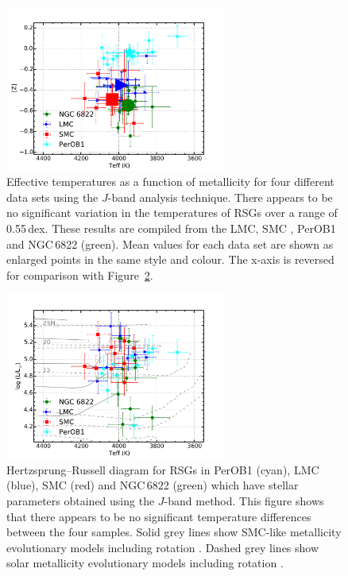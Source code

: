 \begin{figure}
 \centering
\includegraphics[width=0.65\textwidth]{ngc6822/N6822_TeffvsZ-thesis}
\caption[Effective temperature as a function of metallicity from four different environments]{
Effective temperatures as a function of metallicity for four different data sets using the $J$-band analysis technique.
There appears to be no significant variation in the temperatures of RSGs over a range of 0.55\,dex.
These results are compiled from the LMC, SMC
\protect\citep[blue and red points respectively;][]{2015ApJ...806...21D}, PerOB1
\protect\citep[a Galactic RSG cluster; cyan;][]{2014ApJ...788...58G} and NGC\,6822 (green).
Mean values for each data set are shown as enlarged points in the same style and colour.
The x-axis is reversed for comparison with Figure~\ref{fig:HRD}.\label{fig:TvsZ}
         }
\end{figure}

\begin{figure}
 \centering
\includegraphics[width=0.65\textwidth]{ngc6822/N6822_HRD_all_thesis}
\caption[Hertzsprung--Russell diagram from four different environments]{
Hertzsprung--Russell diagram for RSGs in PerOB1 (cyan), LMC (blue), SMC (red) and NGC\,6822 (green) which have stellar parameters obtained using the $J$-band method.
This figure shows that there appears to be no significant temperature differences between the four samples.
Solid grey lines show SMC-like metallicity evolutionary models including rotation
\protect\citep{2013A&A...558A.103G}.
Dashed grey lines show solar metallicity evolutionary models including rotation
\protect\citep{2012A&A...537A.146E}.\label{fig:HRD}
        }
\end{figure}


